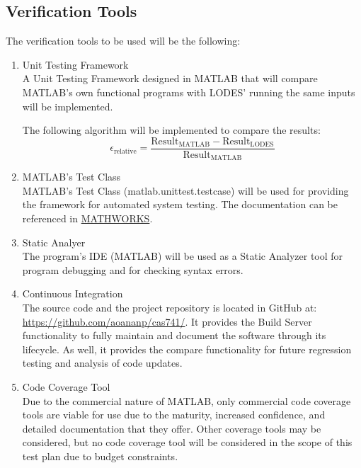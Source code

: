 \documentclass[12pt, titlepage]{article}
\newcommand{\famname}{LODES} %
\newcommand{\famurl}{https://github.com/aoananp/cas741/}
\newcommand{\unittesturl}{https://www.mathworks.com/help/matlab/matlab_prog/author-class-based-unit-tests-
in-matlab.html}
\begin{document}
\subsection{Verification Tools} \label{sec_verificationtools}
The verification tools to be used will be the following:

\begin{enumerate}
\item{Unit Testing Framework\\}
A Unit Testing Framework designed in MATLAB that will compare MATLAB's own functional programs
with \famname{}' running the same inputs will be implemented.

The following algorithm will be implemented to compare the results:
$$\epsilon_{\text{relative}} = \frac{\text{Result}_\text{MATLAB} - \text{Result}_\text{\famname{}}} {\text{Result}
_\text{MATLAB}} $$

\item{MATLAB's Test Class\\}
MATLAB's Test Class (matlab.unittest.testcase) will be used for providing the framework for automated
system testing. The documentation can be referenced in \href{\unittesturl}{MATHWORKS}.

\item{Static Analyer\\}
The program's IDE (MATLAB) will be used as a Static Analyzer tool for program debugging and
for checking syntax errors.

\item{Continuous Integration\\}
The source code and the project repository is located in GitHub at: \url{\famurl}.
It provides the Build Server functionality to fully maintain and document the software through its lifecycle.
As well, it provides the compare functionality for future regression testing and analysis of code updates.

\item{Code Coverage Tool\\}
Due to the commercial nature of MATLAB, only commercial code coverage tools are viable for use due to the 
maturity, increased confidence, and detailed documentation that they offer. Other coverage tools may be 
considered, but no code coverage tool will be considered in the scope of this test plan due to budget constraints.

\end{enumerate}

\end{document}
